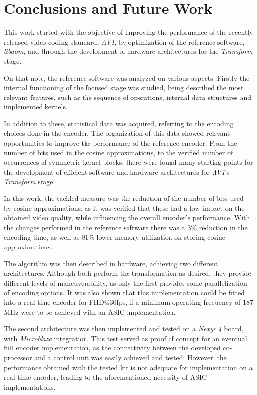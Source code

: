 \cleardoublepage
\chapter{Conclusions and Future Work}


This work started with the objective of improving the performance of the recently released video coding standard, \emph{AV1}, by optimization of the reference software, \emph{libaom}, and through the development of hardware architectures for the \emph{Transform} stage.

On that note, the reference software was analyzed on various aspects. Firstly the internal functioning of the focused stage was studied, being described the most relevant features, such as the sequence of operations, internal data structures and implemented kernels.

In addition to these, statistical data was acquired, referring to the encoding choices done in the encoder. The organization of this data showed relevant opportunities to improve the performance of the reference encoder. From the number of bits used in the cosine approximations, to the verified number of occurrences of symmetric kernel blocks, there were found many starting points for the development of efficient software and hardware architectures for \emph{AV1}'s \emph{Transform} stage.

In this work, the tackled measure was the reduction of the number of bits used by cosine approximations, as it was verified that these had a low impact on the obtained video quality, while influencing the overall encoder's performance. With the changes performed in the reference software there was a $3\%$ reduction in the encoding time, as well as $81\%$ lower memory utilization on storing cosine approximations.

The algorithm was then described in hardware, achieving two different architectures. Although both perform the transformation as desired, they provide different levels of maneuverability, as only the first provides some parallelization of encoding options. It was also shown that this implementation could be fitted into a real-time encoder for FHD@30fps, if a minimum operating frequency of 187 MHz were to be achieved with an ASIC implementation.

The second architecture was then implemented and tested on a \emph{Nexys 4} board, with \emph{Microblaze} integration. This test served as proof of concept for an eventual full encoder implementation, as the connectivity between the developed co-processor and a control unit was easily achieved and tested. However, the  performance obtained with the tested kit is not adequate for implementation on a real time encoder, leading to the aforementioned necessity of ASIC implementations.

